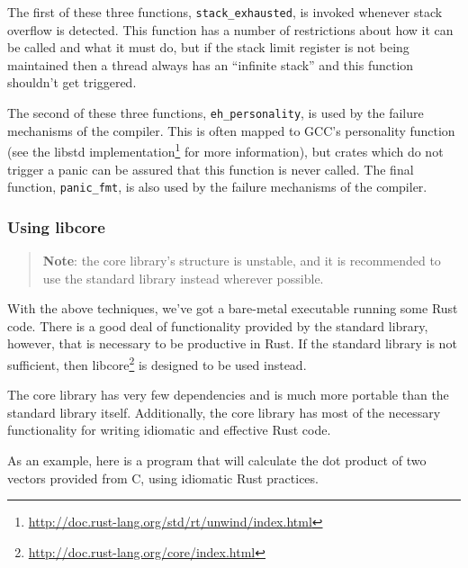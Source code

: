 \documentclass[a4paper,]{book}
\renewcommand{\href}[2]{#2\footnote{\url{#1}}}
\begin{document}
The first of these three functions, \texttt{stack\_exhausted}, is
invoked whenever stack overflow is detected. This function has a number
of restrictions about how it can be called and what it must do, but if
the stack limit register is not being maintained then a thread always
has an ``infinite stack'' and this function shouldn't get triggered.

The second of these three functions, \texttt{eh\_personality}, is used
by the failure mechanisms of the compiler. This is often mapped to GCC's
personality function (see the
\href{http://doc.rust-lang.org/std/rt/unwind/index.html}{libstd
implementation} for more information), but crates which do not trigger a
panic can be assured that this function is never called. The final
function, \texttt{panic\_fmt}, is also used by the failure mechanisms of
the compiler.

\subsubsection{Using libcore}\label{using-libcore}

\begin{quote}
\textbf{Note}: the core library's structure is unstable, and it is
recommended to use the standard library instead wherever possible.
\end{quote}

With the above techniques, we've got a bare-metal executable running
some Rust code. There is a good deal of functionality provided by the
standard library, however, that is necessary to be productive in Rust.
If the standard library is not sufficient, then
\href{http://doc.rust-lang.org/core/index.html}{libcore} is designed to
be used instead.

The core library has very few dependencies and is much more portable
than the standard library itself. Additionally, the core library has
most of the necessary functionality for writing idiomatic and effective
Rust code.

As an example, here is a program that will calculate the dot product of
two vectors provided from C, using idiomatic Rust practices.
\end{document}
